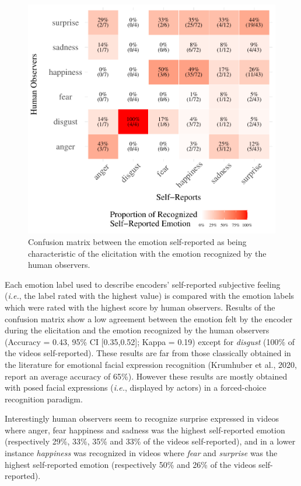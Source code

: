\documentclass[
  english,
  doc]{apa7}
\begin{document}
\begin{figure}[!h]
\includegraphics[width=\textwidth]{manuscript_apa_files/figure-latex/confusionMatrix-sr-hr-1} \caption{Confusion matrix between the emotion self-reported as being characteristic of the elicitation with the emotion recognized by the human observers.}\label{fig:confusionMatrix-sr-hr}
\end{figure}

Each emotion label used to describe encoders' self-reported subjective feeling (\emph{i.e.}, the label rated with the highest value) is compared with the emotion labels which were rated with the highest score by human observers. Results of the confusion matrix show a low agreement between the emotion felt by the encoder during the elicitation and the emotion recognized by the human observers (Accuracy = 0.43, 95\% CI {[}0.35,0.52{]}; Kappa = 0.19) except for \emph{disgust} (100\% of the videos self-reported). These results are far from those classically obtained in the literature for emotional facial expression recognition (Krumhuber et al., 2020, report an average accuracy of 65\%). However these results are mostly obtained with posed facial expressions (\emph{i.e.}, displayed by actors) in a forced-choice recognition paradigm.

Interestingly human observers seem to recognize surprise expressed in videos where anger, fear happiness and sadness was the highest self-reported emotion (respectively 29\%, 33\%, 35\% and 33\% of the videos self-reported), and in a lower instance \emph{happiness} was recognized in videos where \emph{fear} and \emph{surprise} was the highest self-reported emotion (respectively 50\% and 26\% of the videos self-reported).
\end{document}
